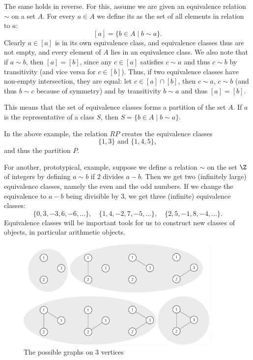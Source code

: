 The same holds in reverse. For this, assume we are given an equivalence
relation $\sim$ on a set $A$. For every $a\in A$ we 
define its  as the set of all elements in relation
to $a$:
\[
[a]=\{b\in A\mid b\sim a\}.
\]
Clearly $a\in[a]$ is in its own equivalence class, and equivalence classes
thus are not empty, and every element of $A$ lies in an equivalence class.
We also note that if $a\sim b$, then $[a]=[b]$, since any $c\in[a]$
satisfies $c\sim a$ and thus $c\sim b$ by transitivity (and vice versa for
$c\in[b]$). Thus, if two equivalence classes have non-empty intersection,
they are equal: let $c\in [a]\cap [b]$, then $c\sim a$, $c\sim b$ (and
thus $b\sim c$
because of symmetry) and by transitivity $b\sim a$ and thus $[a]=[b]$.

This means that the set of equivalence classes forms a partition of the set
$A$. If $a$ is the representative of a class $S$, then $S=\{b\in A\mid b\sim a\}$.

In the above example, the relation  $RP$
creates the equivalence classes
\[
\{1,3\}\mbox{\ and\ }\{1,4,5\},
\] and thus the partition $P$.

For another, prototypical, example, suppose we define a relation $\sim$ on the set $\Z$ of
integers by defining $a\sim b$ if $2$ divides $a-b$. Then we get two
(infinitely large)
equivalence classes, namely the even and the odd numbers. If we change the
equivalence to $a-b$ being divisible by $3$, we get three
(infinite) equivalence classes:
\[
\{0,3,-3,6,-6,\ldots\},\quad
\{1,4,-2,7,-5,\ldots\},\quad
\{2,5,-1,8,-4,\ldots\}.
\]
Equivalence classes will be important tools for us to construct new classes
of objects, in particular arithmetic objects.
\medskip

\begin{figure}[t]
\begin{center}
\includegraphics[width=10cm]{pic/GraphIsoClasses.pdf}
\end{center}
\caption{The possible graphs on 3 vertices}
\label{3vertexgraphs}
\end{figure}

